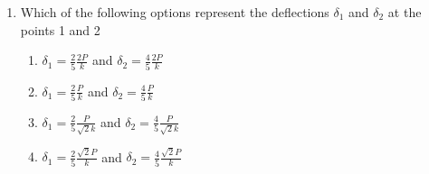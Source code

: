\documentclass[journal,12pt,onecolumn]{IEEEtran}
\theoremstyle{remark}
\begin{document}
\begin{enumerate}
\begin{figure}[!ht]
\label{fig:my_label}
\end{figure}

\item Which of the following options represent the deflections $\delta_{1}$ and $\delta_{2}$ at the points 1 and 2

\begin{enumerate}
    \item $\delta_1 = \frac{2}{5} \frac{2P}{k}$ and $\delta_2 = \frac{4}{5} \frac{2P}{k}$
    \item $\delta_1 = \frac{2}{5} \frac{P}{k}$ and $\delta_2 = \frac{4}{5} \frac{P}{k}$
    \item $\delta_1 = \frac{2}{5} \frac{P}{\sqrt{2}k}$ and $\delta_2 = \frac{4}{5} \frac{P}{\sqrt{2}k}$
    \item $\delta_1 = \frac{2}{5} \frac{\sqrt{2}P}{k}$ and $\delta_2 = \frac{4}{5} \frac{\sqrt{2}P}{k}$
\end{enumerate}
    




    
\end{enumerate}
\end{document}
